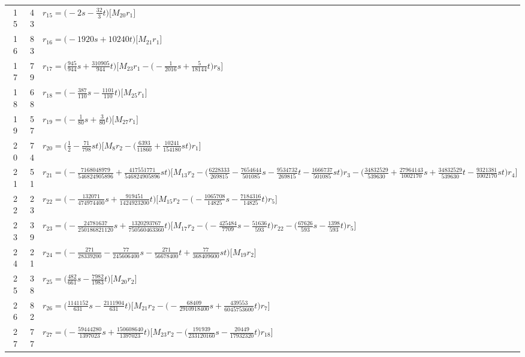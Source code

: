 \begin{longtable}{@{}rrP{.80\linewidth}@{}}
15 & 43 & $r_{15}=\bigl(-2s-\frac{32}{3}t\bigr)\bigl[M_{20}r_{1}\bigr]$\\
16 & 83 & $r_{16}=\bigl(-1920s+\allowbreak 10240t\bigr)\bigl[M_{21}r_{1}\bigr]$\\
17 & 79 & $r_{17}=\bigl(\frac{945}{944}s+\allowbreak \frac{310905}{944}t\bigr)\bigl[M_{23}r_{1}-\allowbreak \bigl(-\frac{1}{2016}s+\allowbreak \frac{5}{18144}t\bigr)r_{8}\bigr]$\\
18 & 68 & $r_{18}=\bigl(-\frac{387}{110}s-\frac{1101}{110}t\bigr)\bigl[M_{25}r_{1}\bigr]$\\
19 & 57 & $r_{19}=\bigl(-\frac{1}{80}s+\allowbreak \frac{3}{80}t\bigr)\bigl[M_{27}r_{1}\bigr]$\\
20 & 74 & $r_{20}=\bigl(\frac{1}{2}-\frac{71}{798}st\bigr)\bigl[M_{8}r_{2}-\allowbreak \bigl(\frac{6393}{11860}+\allowbreak \frac{10241}{154180}st\bigr)r_{1}\bigr]$\\
21 & 51 & $r_{21}=\bigl(-\frac{7168048979}{546824905896}+\allowbreak \frac{417551771}{546824905896}st\bigr)\bigl[M_{13}r_{2}-\allowbreak \bigl(\frac{6228333}{269815}-\frac{7654644}{501085}s-\frac{9534732}{269815}t-\frac{1666737}{501085}st\bigr)r_{3}-\allowbreak \bigl(\frac{34832529}{539630}+\allowbreak \frac{27964143}{1002170}s+\allowbreak \frac{34832529}{539630}t-\frac{9321381}{1002170}st\bigr)r_{4}\bigr]$\\
22 & 23 & $r_{22}=\bigl(-\frac{132071}{474974400}s+\allowbreak \frac{919451}{1424923200}t\bigr)\bigl[M_{15}r_{2}-\allowbreak \bigl(-\frac{1065708}{14825}s-\frac{7184316}{14825}t\bigr)r_{5}\bigr]$\\
23 & 39 & $r_{23}=\bigl(-\frac{24781637}{250186821120}s+\allowbreak \frac{1320293767}{750560463360}t\bigr)\bigl[M_{17}r_{2}-\allowbreak \bigl(-\frac{425484}{7709}s-\frac{51636}{593}t\bigr)r_{22}-\allowbreak \bigl(\frac{67626}{593}s-\frac{1398}{593}t\bigr)r_{5}\bigr]$\\
24 & 21 & $r_{24}=\bigl(-\frac{271}{28339200}-\frac{77}{245606400}s-\frac{271}{56678400}t+\allowbreak \frac{77}{368409600}st\bigr)\bigl[M_{19}r_{2}\bigr]$\\
25 & 38 & $r_{25}=\bigl(\frac{482}{661}s-\frac{7982}{1983}t\bigr)\bigl[M_{20}r_{2}\bigr]$\\
26 & 82 & $r_{26}=\bigl(\frac{1141152}{631}s-\frac{2111904}{631}t\bigr)\bigl[M_{21}r_{2}-\allowbreak \bigl(-\frac{68409}{2910918400}s+\allowbreak \frac{439553}{6045753600}t\bigr)r_{7}\bigr]$\\
27 & 77 & $r_{27}=\bigl(-\frac{59444280}{1397023}s+\allowbreak \frac{150608640}{1397023}t\bigr)\bigl[M_{23}r_{2}-\allowbreak \bigl(\frac{191939}{233120160}s-\frac{20449}{17932320}t\bigr)r_{18}\bigr]$\\

\end{longtable}
